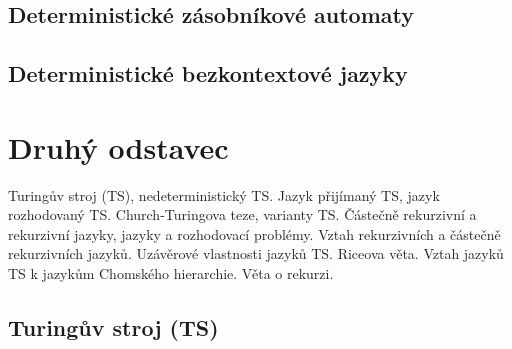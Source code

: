 \documentclass[10pt,a4paper]{article}
\theoremstyle{note}
\begin{document}
	\subsection{Deterministické zásobníkové automaty}

	\subsection{Deterministické bezkontextové jazyky}



\section{Druhý odstavec}

Turingův stroj (TS), nedeterministický TS. Jazyk přijímaný TS, jazyk rozhodovaný TS. Church-Turingova
teze, varianty TS. Částečně rekurzivní a rekurzivní jazyky, jazyky a rozhodovací problémy. Vztah rekurzivních
a částečně rekurzivních jazyků. Uzávěrové vlastnosti jazyků TS. Riceova věta. Vztah jazyků TS k jazykům
Chomského hierarchie. Věta o rekurzi.

	\subsection{Turingův stroj (TS)}
\end{document}
